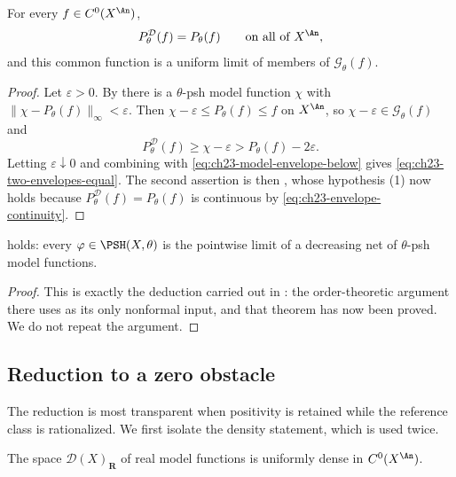 \begin{corollary}
\label{cor:ch23-envelope-by-model-functions}
For every $f\in C^0(X^{\An})$,
\begin{equation}\label{eq:ch23-two-envelopes-equal}
 P^{\mathcal D}_\theta(f)=P_\theta(f)
 \qquad\text{on all of }X^{\An},
\end{equation}
and this common function is a uniform limit of members of
$\mathcal G_\theta(f)$.
\end{corollary}

\begin{proof}
Let $\varepsilon>0$.  By  there is a
$\theta$-psh model function $\chi$ with
$\|\chi-P_\theta(f)\|_\infty<\varepsilon$.  Then
$\chi-\varepsilon\leq P_\theta(f)\leq f$ on $X^{\An}$, so
$\chi-\varepsilon\in\mathcal G_\theta(f)$ and
\[
 P^{\mathcal D}_\theta(f)\geq\chi-\varepsilon>P_\theta(f)-2\varepsilon .
\]
Letting $\varepsilon\downarrow0$ and combining with
\eqref{eq:ch23-model-envelope-below} gives
\eqref{eq:ch23-two-envelopes-equal}.  The second assertion is then
, whose hypothesis (1) now holds because
$P^{\mathcal D}_\theta(f)=P_\theta(f)$ is continuous by
\eqref{eq:ch23-envelope-continuity}.
\end{proof}

\begin{corollary}
\label{cor:ch23-decreasing-regularization-pointer}
 holds: every
$\varphi\in\PSH(X,\theta)$ is the pointwise limit of a decreasing net of
$\theta$-psh model functions.
\end{corollary}

\begin{proof}
This is exactly the deduction carried out in
: the order-theoretic argument there uses
 as its only nonformal input, and that
theorem has now been proved.  We do not repeat the argument.
\end{proof}

\subsection{Reduction to a zero obstacle}

The reduction is most transparent when positivity is retained while the
reference class is rationalized.  We first isolate the density statement,
which is used twice.

\begin{lemma}
\label{lem:ch23-model-density}
The space $\mathcal D(X)_{\mathbf R}$ of real model functions is uniformly
dense in $C^0(X^{\An})$.
\end{lemma}

